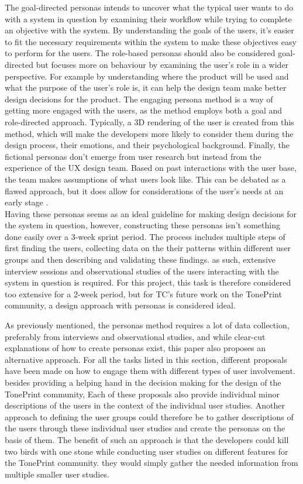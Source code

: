The goal-directed personas intends to uncover what the typical user wants to do with a system in question by examining their workflow while trying to complete an objective with the system. By understanding the goals of the users, it's easier to fit the necessary requirements within the system to make these objectives easy to perform for the users. The role-based personas should also be considered goal-directed but focuses more on behaviour by examining the user's role in a wider perspective. For example by understanding where the product will be used and what the purpose of the user's role is, it can help the design team make better design decisions for the product. The engaging persona method is a way of getting more engaged with the users, as the method employs both a goal and role-directed approach. Typically, a 3D rendering of the user is created from this method, which will make the developers more likely to consider them during the design process, their emotions, and their psychological background. Finally, the fictional personas don't emerge from user research but instead from the experience of the UX design team. Based on past interactions with the user base, the team makes assumptions of what users look like. This can be debated as a flawed approach, but it does allow for considerations of the user's needs at an early stage \parencite[][11]{WEB:PersonaKilde}.\\

\noindent
Having these personas seems as an ideal guideline for making design decisions for the system in question, however, constructing these personas isn't something done easily over a 3-week sprint period. The process includes multiple steps of first finding the users, collecting data on the their patterns within different user groups and then describing and validating these findings. as such, extensive interview sessions and observational studies of the users interacting with the system in question is required. For this project, this task is therefore considered too extensive for a 2-week period, but for TC's future work on the TonePrint community, a design approach with personas is considered ideal.

As previously mentioned, the personas method requires a lot of data collection, preferably from interviews and observational studies, and while clear-cut explanations of how to create personas exist, this paper also proposes an alternative approach. For all the tasks listed in this section, different proposals have been made on how to engage them with different types of user involvement. besides providing a helping hand in the decision making for the design of the TonePrint community, Each of these proposals also provide individual minor descriptions of the users in the context of the individual user studies. Another approach to defining the user groups could therefore be to gather descriptions of the users through these individual user studies and create the personas on the basis of them. The benefit of such an approach is that the developers could kill two birds with one stone while conducting user studies on different features for the TonePrint community. they would simply gather the needed information from multiple smaller user studies.
